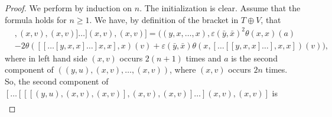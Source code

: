 \documentclass[11pt, twoside]{article}
\begin{document}
\begin{proof}
   We perform by induction on $n$. The initialization is clear. Assume that the formula holds for $n\geq 1$. We have, by definition of the bracket in $T\oplus V$, that \begin{align*}
        [\dots[[[(y,u),(x,v),(x,v)]&,(x,v),(x,v)]\dots](x,v),(x,v)]=((y,x,\dots,x), \varepsilon(\bar{y},\bar{x})^2\theta(x,x)(a) \\ &-2\theta([[\dots[y,x,x]\dots]x,x],x)(v)+\varepsilon(\bar{y},\bar{x})\theta(x,[\dots[[y,x,x]\dots],x,x])(v)),
    \end{align*} where in left hand side $(x,v)$ occurs $2(n+1)$ times and $a$ is the second component of  $((y,u),(x,v),\dots,(x,v))$, where $(x,v)$ occurs $2n$ times.\\ So, the second component of $ [\dots[[[(y,u),(x,v),(x,v)],(x,v),(x,v)]\dots](x,v),(x,v)] $ is \begin{align*}

\end{align*}
\end{proof}
\end{document}
